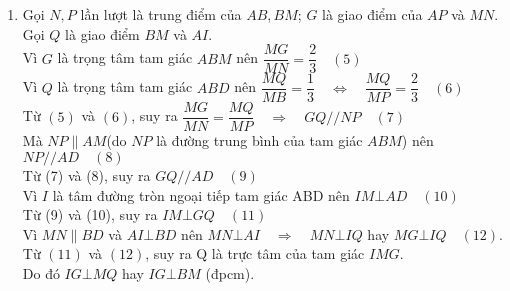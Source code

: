 \begin{ex}
{\begin{enumerate}
		\item Gọi $N, P$ lần lượt là trung điểm của $AB, BM$; $G$ là giao điểm của $AP$ và $MN$. Gọi $Q$ là giao điểm $BM$ và $AI$.\\
		Vì $G$ là trọng tâm tam giác $ABM$ nên $\dfrac{MG}{MN}=\dfrac{2}{3}\quad (5)$\\
		Vì $Q$ là trọng tâm tam giác $ABD$ nên $\dfrac{MQ}{MB}=\dfrac{1}{3}\quad \Leftrightarrow \quad \dfrac{MQ}{MP}=\dfrac{2}{3}\quad (6)$\\
		Từ $(5)$ và $(6)$, suy ra $\dfrac{MG}{MN}=\dfrac{MQ}{MP}\quad \Rightarrow \quad GQ//NP\quad (7)$\\
		Mà $NP\parallel AM$(do $NP$ là đường trung bình của tam giác $ABM$) nên $NP//AD\quad (8)$\\
		Từ (7) và (8), suy ra $GQ//AD\quad (9)$\\
		Vì $I$ là tâm đường tròn ngoại tiếp tam giác ABD nên $IM\bot AD\quad (10)$\\
		Từ (9) và (10), suy ra $IM\bot GQ\quad (11)$\\
		Vì $MN\parallel BD$ và $AI\bot BD$ nên $MN\bot AI\quad \Rightarrow \quad MN\bot IQ$ hay $MG\bot IQ\quad (12)$.\\
		Từ $(11)$ và $(12)$, suy ra Q là trực tâm của tam giác $IMG$.\\
		Do đó $IG\bot MQ$ hay $IG\bot BM$ (đpcm).
	\end{enumerate}
	}
\end{ex}

